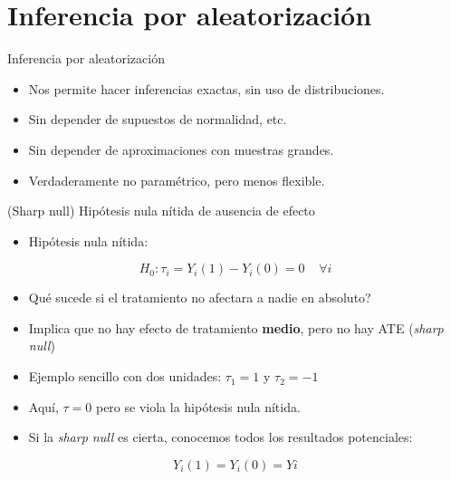 \documentclass[
  ignorenonframetext,
]{beamer}
\providecommand{\tightlist}{%
  \setlength{\itemsep}{0pt}\setlength{\parskip}{0pt}}
\begin{document}
\hypertarget{inferencia-por-aleatorizaciuxf3n}{%
\section{Inferencia por
aleatorización}\label{inferencia-por-aleatorizaciuxf3n}}

\begin{frame}{Inferencia por aleatorización}
\protect\hypertarget{inferencia-por-aleatorizaciuxf3n-1}{}
\begin{itemize}
\tightlist
\item
  Nos permite hacer inferencias exactas, sin uso de distribuciones.
  \pause
\item
  Sin depender de supuestos de normalidad, etc. \pause
\item
  Sin depender de aproximaciones con muestras grandes. \pause
\item
  Verdaderamente no paramétrico, pero menos flexible.
\end{itemize}
\end{frame}

\begin{frame}{(Sharp null) Hipótesis nula nítida de ausencia de efecto}
\protect\hypertarget{sharp-null-hipuxf3tesis-nula-nuxedtida-de-ausencia-de-efecto}{}
\begin{itemize}
\tightlist
\item
  Hipótesis nula nítida:
\end{itemize}

\[H_0: \tau_i  = Y_i(1) - Y_i(0) = 0 \;\;\;\;  \forall i\]\pause

\begin{itemize}
\item
  Qué sucede si el tratamiento no afectara a nadie en absoluto?\pause
\item
  Implica que no hay efecto de tratamiento \textbf{medio}, pero no hay
  ATE (\emph{sharp null})\pause
\item
  Ejemplo sencillo con dos unidades: \(\tau_1 = 1\) y
  \(\tau_2 = -1\)\pause
\item
  Aquí, \(\tau = 0\) pero se viola la hipótesis nula nítida.\pause
\item
  Si la \emph{sharp null} es cierta, conocemos todos los resultados
  potenciales:
\end{itemize}

\[Y_i(1) = Y_i(0) = Y{i}\]
\end{frame}
\end{document}
